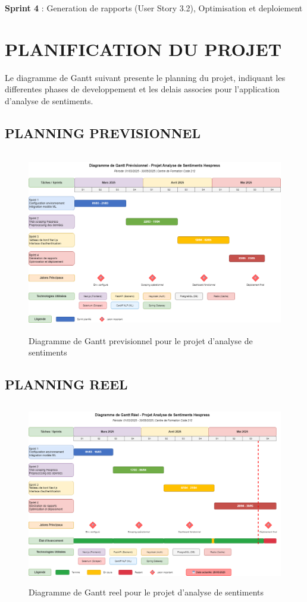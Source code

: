 \textbf{Sprint 4} : Generation de rapports (User Story 3.2), Optimisation et deploiement

\section{PLANIFICATION DU PROJET}

Le diagramme de Gantt suivant presente le planning du projet, indiquant les differentes phases de developpement et les delais associes pour l'application d'analyse de sentiments.

\subsection{PLANNING PREVISIONNEL}

\begin{figure}[H]
\centering
\includegraphics[height=8cm , width=\textwidth]{assets/images/gantt-previsionnel.png}
\caption{Diagramme de Gantt previsionnel pour le projet d'analyse de sentiments}
\label{fig:gantt-prev}
\end{figure}

\subsection{PLANNING REEL}

\begin{figure}[H]
\centering
\includegraphics[height=8cm , width=\textwidth]{assets/images/gantt-reel.png}
\caption{Diagramme de Gantt reel pour le projet d'analyse de sentiments}
\label{fig:gantt-reel}
\end{figure}

